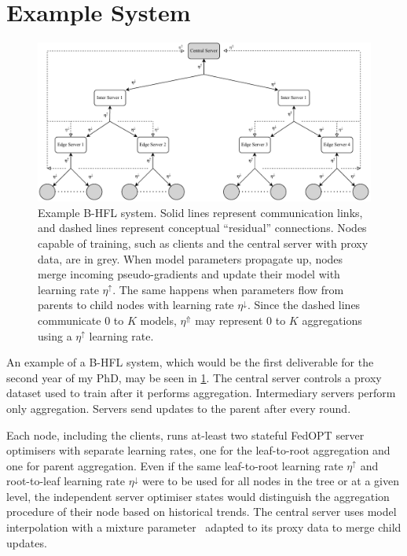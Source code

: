 \section{Example System}\label{sec:proposal:example_system}
\begin{figure}[h]
    \centering
    \includegraphics[clip,width=\columnwidth]{plots/Tree_Structure.drawio.pdf}
    \caption[System Diagram]{Example B-HFL system. Solid lines represent communication links, and dashed lines represent conceptual ``residual'' connections. Nodes capable of training, such as clients and the central server with proxy data, are in grey. When model parameters propagate up, nodes merge incoming pseudo-gradients and update their model with learning rate $\eta^\uparrow$. The same happens when parameters flow from parents to child nodes with learning rate $\eta^\downarrow$. Since the dashed lines communicate $0$ to $K$ models, $\eta^\Uparrow$ may represent $0$ to $K$ aggregations using a $\eta^\uparrow$ learning rate.}\label{fig:TreeStructure}
\end{figure}

An example of a B-HFL system, which would be the first deliverable for the second year of my PhD, may be seen in \cref{fig:TreeStructure}. The central server controls a proxy dataset used to train after it performs aggregation. Intermediary servers perform only aggregation. Servers send updates to the parent after every round.

Each node, including the clients, runs at-least two stateful FedOPT server optimisers with separate learning rates, one for the leaf-to-root aggregation and one for parent aggregation. Even if the same leaf-to-root learning rate $\eta^\uparrow$ and root-to-leaf learning rate $\eta^\downarrow$ were to be used for all nodes in the tree or at a given level, the independent server optimiser states would distinguish the aggregation procedure of their node based on historical trends. The central server uses model interpolation with a mixture parameter~\citep{AdaptivePersonalisedFederatedLearning} adapted to its proxy data to merge child updates.

